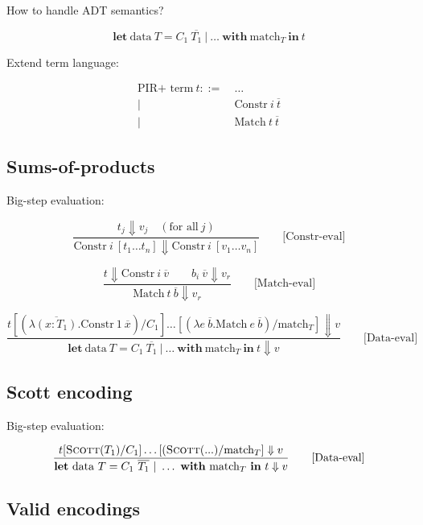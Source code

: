\documentclass{article}
\begin{document}
How to handle ADT semantics?

\[
\textbf{let}\ \text{data}\ T = C_1\ \overline{T_{1}} \ |\ \dots\ \textbf{with}\ \text{match}_T\ \textbf{in}\ t
\]

Extend term language:

\begin{align*}
\text{PIR+ term}\ t ::=\ &\ldots \\
|\ &\text{Constr}\ i\ \overline{t} \\
|\ &\text{Match}\ t\ \overline{t}
\end{align*}


\subsection*{Sums-of-products}
Big-step evaluation:

\[
\frac{t_j \Downarrow v_j \quad (\text{for all}\ j)}{\text{Constr}\ i\ [t_1 \dots t_n] \Downarrow \text{Constr}\ i\ [v_1 \dots v_n]}
\qquad\text{[Constr-eval]}
\]

\[
  \frac{t \Downarrow \text{Constr}\ i\ \overline{v} \quad\quad b_i\ \overline{v} \Downarrow v_r}
       {\text{Match}\ t\ \overline{b} \Downarrow v_r}
  \qquad\text{[Match-eval]}
\]

\[\frac{t [(\lambda \overline{(x : T_{1})}.\text{Constr}\ 1\ \overline{x}) / C_1] \dots [(\lambda e\ \overline{b}. \text{Match}\ e\ \overline{b}) / \text{match}_T]
       \Downarrow
       v} 
       {\textbf{let}\ \text{data}\ T = C_1\ \overline{T_{1}} \ |\ \dots\ \textbf{with}\ \text{match}_T\ \textbf{in}\ t
       \Downarrow
       v}
  \qquad\text{[Data-eval]}
\]


\subsection*{Scott encoding}

Big-step evaluation:

\[\frac{t [\textsc{Scott}(T_1) / C_1] \dots [(\textsc{Scott}(...) / \text{match}_T]
       \Downarrow
       v} 
       {\textbf{let}\ \text{data}\ T = C_1\ \overline{T_{1}} \ |\ \dots\ \textbf{with}\ \text{match}_T\ \textbf{in}\ t
       \Downarrow
       v}
  \qquad\text{[Data-eval]}
\]


\clearpage

\subsection*{Valid encodings}
\end{document}
